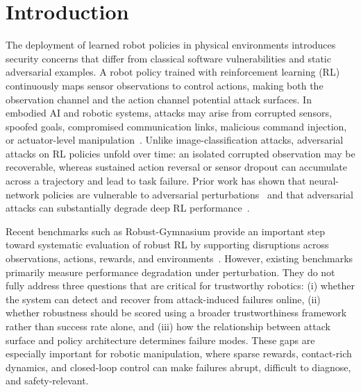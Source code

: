 \documentclass[conference]{IEEEtran}
\begin{document}
\section{Introduction}

The deployment of learned robot policies in physical environments introduces security
concerns that differ from classical software vulnerabilities and static adversarial
examples. A robot policy trained with reinforcement learning (RL) continuously maps
sensor observations to control actions, making both the observation channel and the
action channel potential attack surfaces. In embodied AI and robotic systems, attacks
may arise from corrupted sensors, spoofed goals, compromised communication links,
malicious command injection, or actuator-level manipulation~\cite{xing2025robustembodied}.
Unlike image-classification attacks, adversarial attacks on RL policies unfold over
time: an isolated corrupted observation may be recoverable, whereas sustained action
reversal or sensor dropout can accumulate across a trajectory and lead to task failure.
Prior work has shown that neural-network policies are vulnerable to adversarial
perturbations~\cite{huang2017adversarial} and that adversarial attacks can substantially
degrade deep RL performance~\cite{pattanaik2018robust}.

Recent benchmarks such as Robust-Gymnasium provide an important step toward systematic
evaluation of robust RL by supporting disruptions across observations, actions, rewards,
and environments~\cite{gu2025robustgymnasium}. However, existing benchmarks primarily
measure performance degradation under perturbation. They do not fully address three
questions that are critical for trustworthy robotics: (i) whether the system can detect
and recover from attack-induced failures online, (ii) whether robustness should be
scored using a broader trustworthiness framework rather than success rate alone, and
(iii) how the relationship between attack surface and policy architecture determines
failure modes. These gaps are especially important for robotic manipulation, where
sparse rewards, contact-rich dynamics, and closed-loop control can make failures abrupt,
difficult to diagnose, and safety-relevant.
\end{document}
